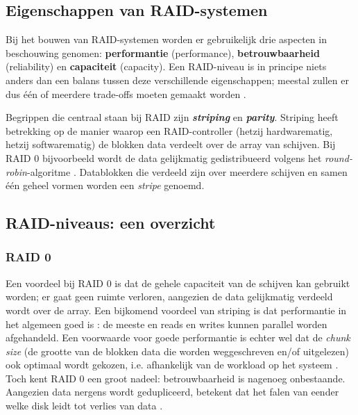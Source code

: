 \subsection{Eigenschappen van RAID-systemen}

Bij het bouwen van RAID-systemen worden er gebruikelijk drie aspecten in beschouwing genomen: \textbf{\gls{performantie}} (performance), \textbf{\gls{betrouwbaarheid}} (reliability) en \textbf{\gls{capaciteit}} (capacity). Een RAID-niveau is in principe niets anders dan een balans tussen deze verschillende eigenschappen; meestal zullen er dus één of meerdere trade-offs moeten gemaakt worden \autocite{Chen1994}.

Begrippen die centraal staan bij RAID zijn \textit{\textbf{striping}} en \textit{\textbf{parity}}. Striping heeft betrekking op de manier waarop een RAID-controller (hetzij hardwarematig, hetzij softwarematig) de blokken data verdeelt over de array van schijven. Bij RAID 0 bijvoorbeeld wordt de data gelijkmatig gedistribueerd volgens het \textit{round-robin}-algoritme \autocite{OSThreePiecesRemzi2015}. Datablokken die verdeeld zijn over meerdere schijven en samen één geheel vormen worden een \textit{stripe} genoemd. \\ 

\subsection{RAID-niveaus: een overzicht}

\subsubsection{RAID 0}

Een voordeel bij RAID 0 is dat de gehele capaciteit van de schijven kan gebruikt worden; er gaat geen ruimte verloren, aangezien de data gelijkmatig verdeeld wordt over de array. Een bijkomend voordeel van striping is dat performantie in het algemeen goed is \autocite{OSThreePiecesRemzi2015} : de meeste en reads en writes kunnen parallel worden afgehandeld. Een voorwaarde voor goede performantie is echter wel dat de \textit{chunk size} (de grootte van de blokken data die worden weggeschreven en/of uitgelezen) ook optimaal wordt gekozen, i.e. afhankelijk van de workload op het systeem \autocite{OSThreePiecesRemzi2015}. Toch kent RAID 0 een groot nadeel: betrouwbaarheid is nagenoeg onbestaande. Aangezien data nergens wordt gedupliceerd, betekent dat het falen van eender welke disk leidt tot verlies van data \autocite{OSThreePiecesRemzi2015}.

